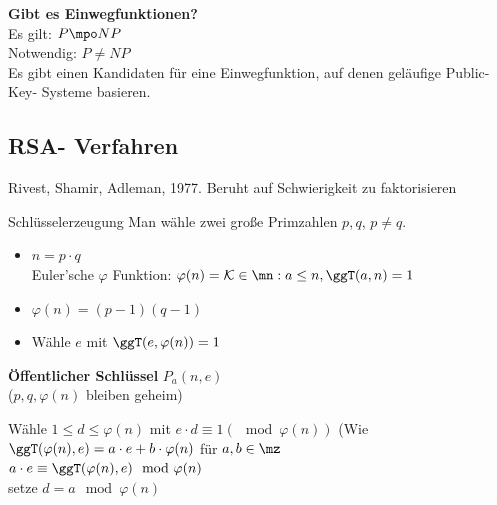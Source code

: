 		\textbf{Gibt es Einwegfunktionen?}\\
		Es gilt: $P\mpo NP$\\
		Notwendig: $P\neq NP$\\
		Es gibt einen Kandidaten für eine Einwegfunktion, auf denen geläufige Public- Key- Systeme basieren.
	
	\subsection{RSA- Verfahren}
		Rivest, Shamir, Adleman, 1977. Beruht auf Schwierigkeit zu faktorisieren
			\item Schlüsselerzeugung
				Man wähle zwei große Primzahlen $p,q$, $p\neq q$.
				\begin{itemize}
				\item $n=p\cdot q$\\
				Euler'sche $\varphi$ Funktion: $\varphi(n)=\mathcal{K}\in\mn:a\leq n, \ggT(a,n)=1$\\
				\item $\varphi(n)=(p-1)(q-1)$
				\item Wähle $e$ mit $\ggT(e,\varphi(n))=1$
				\end{itemize}
				
				\textbf{Öffentlicher Schlüssel} $P_a(n,e)$\\
				($p,q,\varphi(n)$ bleiben geheim)
				
				Wähle $1\leq d\leq\varphi(n)$ mit $e\cdot d\equiv 1(\mod \varphi(n))$ (Wie $\ggT(\varphi(n),e)=a\cdot e+b\cdot\varphi(n)$ für $a,b\in\mz$\\
				$a\cdot e\equiv\ggT(\varphi(n),e)\mod\varphi(n)$\\
				setze $d=a\mod\varphi(n)$
				
